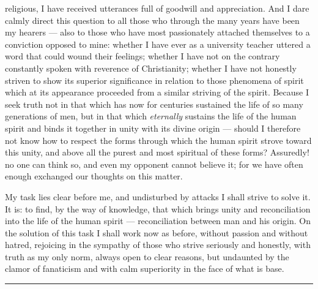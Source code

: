 \documentclass[12pt,a4paper]{book}
\begin{document}
religious, I have received utterances full of goodwill and appreciation. And I
dare calmly direct this question to all those who through the many years have
been my hearers --- also to those who have most passionately attached themselves
to a conviction opposed to mine: whether I have ever as a university teacher
uttered a word that could wound their feelings; whether I have not on the
contrary constantly spoken with reverence of Christianity; whether I have not
honestly striven to show its superior significance in relation to those phenomena
of spirit which at its appearance proceeded from a similar striving of the
spirit. Because I seek truth not in that which has now for centuries sustained
the life of so many generations of men, but in that which \emph{eternally}
sustains
the life of the human spirit and binds it together in unity with its divine
origin --- should I therefore not know how to respect the forms through which
the human spirit strove toward this unity, and above all the purest and most
spiritual of these forms? Assuredly! no one can think so, and even my opponent
cannot believe it; for we have often enough exchanged our thoughts on this matter.

My task lies clear before me, and undisturbed by
attacks I shall strive to solve it. It is: to find, by the way of knowledge, that
which brings unity and reconciliation into the life of the human spirit ---
reconciliation between man and his origin. On the solution of this task I shall
work now as before, without passion and without hatred, rejoicing in the sympathy
of those who strive seriously and honestly, with truth as my only norm, always
open to clear reasons, but undaunted by the clamor of fanaticism and with calm
superiority in the face of what is base.

\begin{center}\rule{2cm}{0.4pt}\end{center}
\end{document}
